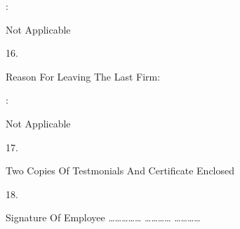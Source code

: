 \documentclass[12pt]{article}
\begin{document}
\begin{minipage}[t]{0.02\linewidth}
:
\end{minipage}
\begin{minipage}[t]{0.38\linewidth}
Not Applicable
\end{minipage}
\begin{minipage}[t]{0.05\linewidth}
16.
\end{minipage}
\begin{minipage}[t]{0.55\linewidth}
Reason  For Leaving  The Last  Firm:
\end{minipage}
\begin{minipage}[t]{0.02\linewidth}
:
\end{minipage}
\begin{minipage}[t]{0.38\linewidth}
Not Applicable
\end{minipage}
\begin{minipage}[t]{0.05\linewidth}
17.
\end{minipage}
\begin{minipage}[t]{0.95\linewidth}
Two Copies  Of  Testmonials  And Certificate  Enclosed
\end{minipage}
\begin{minipage}[t]{0.05\linewidth}
18.
\end{minipage}
\begin{minipage}[t]{0.95\linewidth}
Signature Of Employee …………… ………… …………
\end{minipage}
\end{document}
